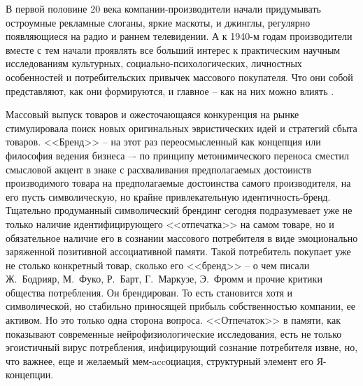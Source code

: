 В первой половине 20 века компании-производители начали придумывать остроумные
рекламные слоганы, яркие маскоты, и  джинглы, регулярно появляющиеся на радио и
раннем телевидении. А к 1940-м годам производители вместе с тем начали проявлять
все больший интерес к практическим научным исследованиям культурных,
социально-психологических, личностных особенностей и потребительских привычек массового
покупателя. Что они собой представляют, как они формируются, и главное -- как на них можно
влиять \autocite{kotlergrayson}.

Массовый выпуск товаров и ожесточающаяся конкуренция на рынке стимулировала поиск
новых оригинальных эвристических идей и стратегий сбыта товаров. <<Бренд>> -- на
этот раз переосмысленный как концепция или философия ведения бизнеса –- по
принципу метонимического переноса сместил смысловой акцент в знаке с расхваливания
предполагаемых достоинств производимого товара на предполагаемые достоинства самого
производителя, на его пусть символическую, но крайне привлекательную  идентичность-бренд.
Тщательно продуманный символический брендинг сегодня подразумевает уже не только
наличие идентифицирующего <<отпечатка>> на самом товаре, но и обязательное наличие
его в сознании массового потребителя в виде эмоционально заряженной позитивной
ассоциативной памяти. Такой потребитель покупает уже не столько конкретный товар,
сколько его <<бренд>> -- о чем писали Ж.~Бодрияр, М.~Фуко, Р.~Барт, Г.~Маркузе, Э.~Фромм
и прочие критики общества потребления. Он брендирован. То есть становится хотя и
символической, но стабильно приносящей прибыль собственностью компании, ее активом.
Но это только одна сторона вопроса. <<Отпечаток>> в памяти, как показывают
современные нейрофизиологические исследования, есть не только эгоистичный вирус
потребления, инфицирующий сознание потребителя извне, но, что важнее, еще и желаемый
мем-accоциация, структурный элемент его
Я-концепции\autocite{browdy2006}\autocite{mesheryakov2004}.

